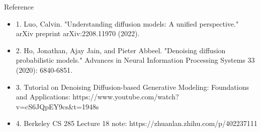\documentclass{beamer}
\begin{document}
\begin{frame}{Reference}
	\begin{itemize}
		\item 1. Luo, Calvin. "Understanding diffusion models: A unified perspective." arXiv preprint arXiv:2208.11970 (2022).
		\item 2. Ho, Jonathan, Ajay Jain, and Pieter Abbeel. "Denoising diffusion probabilistic models." Advances in Neural Information Processing Systems 33 (2020): 6840-6851.
		\item 3. Tutorial on Denoising Diffusion-based Generative Modeling: Foundations and Applications: https://www.youtube.com/watch?v=cS6JQpEY9cs\&t=1948s
		\item 4. Berkeley CS 285 Lecture 18 note: https://zhuanlan.zhihu.com/p/402237111
	\end{itemize}

\end{frame}
\end{document}

